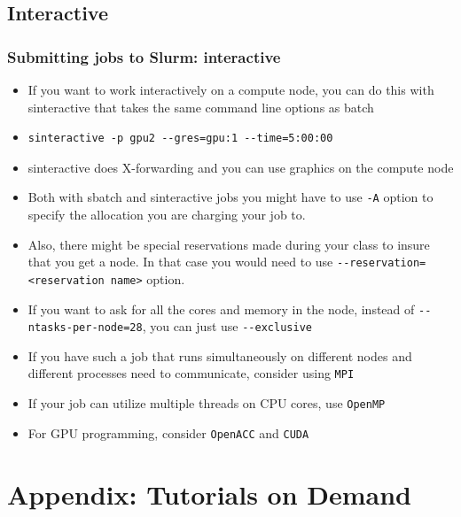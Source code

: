 \documentclass{beamer}
\begin{document}
\subsection{Interactive}
\begin{frame}[fragile]
  \frametitle{Submitting jobs to Slurm: interactive}
  \begin{itemize}
  \item If you want to work interactively on a compute node, you can do this with {\color{mycolorcli}sinteractive} that takes the same command line options as batch
  \item
{\color{mycolorcli} 
\begin{verbatim}
sinteractive -p gpu2 --gres=gpu:1 --time=5:00:00
\end{verbatim}
}
\item {\color{mycolorcli}sinteractive} does X-forwarding and you can use graphics on the compute node
\item Both with sbatch and sinteractive jobs you might have to use {\color{mycolorcli}\verb|-A|} option to specify the allocation you are charging your job to.
\item Also, there might be special reservations made during your class to insure that you get a node. In that case you would need to use  {\color{mycolorcli}\verb|--reservation=<reservation name>|} option.
\item If you want to ask for all the cores and memory in the node, instead of {\color{mycolorcli}\verb|--ntasks-per-node=28|}, you can just use {\color{mycolorcli}\verb|--exclusive|}
\item If you have such a job that runs simultaneously on different nodes and different processes need to communicate, consider using {\color{mycolordef}\verb|MPI|}
\item If your job can utilize multiple threads on CPU cores, use {\color{mycolordef}\verb|OpenMP|}
\item For GPU programming, consider {\color{mycolordef}\verb|OpenACC|} and {\color{mycolordef}\verb|CUDA|}

  \end{itemize}

\end{frame}

\section{Appendix: Tutorials on Demand}

\end{document}
